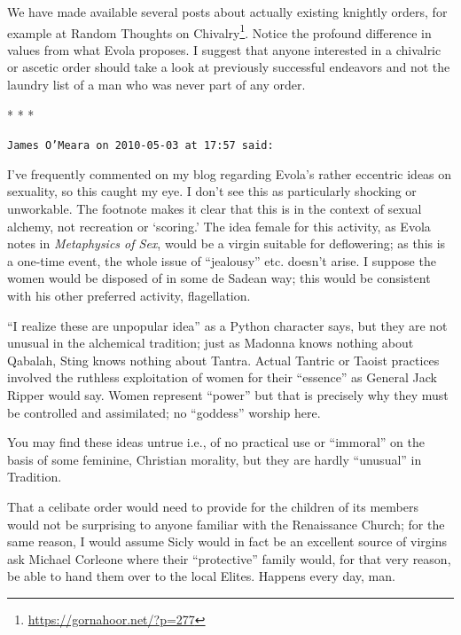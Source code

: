 We have made available several posts about actually existing knightly orders, for example at Random Thoughts on Chivalry\footnote{\url{https://gornahoor.net/?p=277}}. Notice the profound difference in values from what Evola proposes. I suggest that anyone interested in a chivalric or ascetic order should take a look at previously successful endeavors and not the laundry list of a man who was never part of any order.



\begin{center}* * *\end{center}

\begin{footnotesize}
\begin{sffamily}
\texttt{James O'Meara on 2010-05-03 at 17:57 said:}

I've frequently commented on my blog regarding Evola's rather eccentric ideas on sexuality, so this caught my eye. I don't see this as particularly shocking or unworkable. The footnote makes it clear that this is in the context of sexual alchemy, not recreation or `scoring.' The idea female for this activity, as Evola notes in \textit{Metaphysics of Sex}, would be a virgin suitable for deflowering; as this is a one-time event, the whole issue of ``jealousy'' etc. doesn't arise. I suppose the women would be disposed of in some de Sadean way; this would be consistent with his other preferred activity, flagellation.

``I realize these are unpopular idea'' as a Python character says, but they are not unusual in the alchemical tradition; just as Madonna knows nothing about Qabalah, Sting knows nothing about Tantra. Actual Tantric or Taoist practices involved the ruthless exploitation of women for their ``essence'' as General Jack Ripper would say. Women represent ``power'' but that is precisely why they must be controlled and assimilated; no ``goddess'' worship here.

You may find these ideas untrue i.e., of no practical use or ``immoral'' on the basis of some feminine, Christian morality, but they are hardly ``unusual'' in Tradition.

That a celibate order would need to provide for the children of its members would not be surprising to anyone familiar with the Renaissance Church; for the same reason, I would assume Sicly would in fact be an excellent source of virgins ask Michael Corleone where their ``protective'' family would, for that very reason, be able to hand them over to the local Elites. Happens every day, man.


\end{sffamily}
\end{footnotesize}
